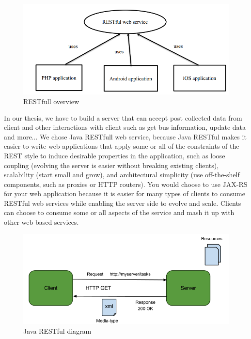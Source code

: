 		\begin{figure}[H]
			\centering
			\includegraphics[scale=0.7]{Chapters/Fig/restfull-overview.png}
			\caption{RESTfull overview}
			\label{fig:RESTfull_overview}
		\end{figure}
	In our thesis, we have to build a server that can accept post collected data from client and other interactions with client such as get bus information, update data and more... We chose Java RESTfull web service, because Java RESTful makes it easier to write web applications that apply some or all of the constraints of the REST style to induce desirable properties in the application, such as loose coupling (evolving the server is easier without breaking existing clients), scalability (start small and grow), and architectural simplicity (use off-the-shelf components, such as proxies or HTTP routers). You would choose to use JAX-RS for your web application because it is easier for many types of clients to consume RESTful web services while enabling the server side to evolve and scale. Clients can choose to consume some or all aspects of the service and mash it up with other web-based services. 

	\begin{figure}[H]
		\centering
		\includegraphics[scale=0.5]{Chapters/Fig/RESTful-Service-Client-Example-Crunchify-Tutorial.png}
		\caption{Java RESTful diagram}
		\label{fig:restful_diagram}
	\end{figure}

